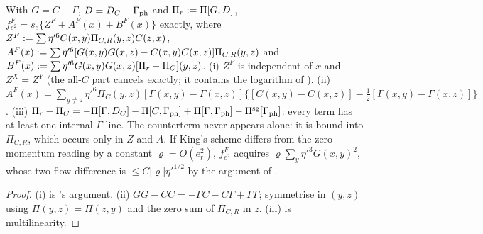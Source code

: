 \begin{lemma}\label{rot:lem:CK5}
With $G=C-\Gamma$, $D=D_C-\Gamma_{\rm ph}$ and $\Pi_r:=\Pi[G,D]$, $f^F_{e^2}=s_e\{Z^F+A^F(x)+B^F(x)\}$ exactly, where $Z^F:=\sum\eta'^6C(x,y)\Pi_{C,R}(y,z)C(z,x)$, $A^F(x):=\sum\eta'^6[G(x,y)G(x,z)-C(x,y)C(x,z)]\Pi_{C,R}(y,z)$ and $B^F(x):=\sum\eta'^6G(x,y)G(x,z)[\Pi_r-\Pi_C](y,z)$. \textup{(i)} $Z^F$ is independent of $x$ and $Z^X=Z^Y$ (the all-$C$ part cancels exactly; it contains the logarithm of ). \textup{(ii)} $A^F(x)=\sum_{y\ne z}\eta'^6\Pi_C(y,z)[\Gamma(x,y)-\Gamma(x,z)]\{[C(x,y)-C(x,z)]-\frac12[\Gamma(x,y)-\Gamma(x,z)]\}$. \textup{(iii)} $\Pi_r-\Pi_C=-\Pi[\Gamma,D_C]-\Pi[C,\Gamma_{\rm ph}]+\Pi[\Gamma,\Gamma_{\rm ph}]-\Pi^{\rm sg}[\Gamma_{\rm ph}]$: every term has at least one internal $\Gamma$-line. The counterterm never appears alone: it is bound into $\Pi_{C,R}$, which occurs only in $Z$ and $A$. If King's scheme differs from the zero-momentum reading by a constant $\varrho=O(e_r^2)$, $f^F_{e^2}$ acquires $\varrho\sum_y\eta'^3G(x,y)^2$, whose two-flow difference is $\le C|\varrho|\eta'^{1/2}$ by the argument of .
\end{lemma}
\begin{proof}
(i) is 's argument. (ii) $GG-CC=-\Gamma C-C\Gamma+\Gamma\Gamma$; symmetrise in $(y,z)$ using $\Pi(y,z)=\Pi(z,y)$ and the zero sum of $\Pi_{C,R}$ in $z$. (iii) is multilinearity.
\end{proof}

